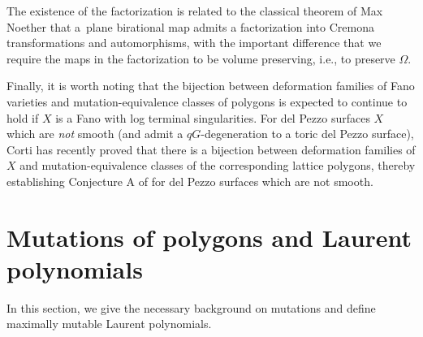 \documentclass[pdftex]{sigma}
\numberwithin{equation}{section}
\begin{document}
The existence of the factorization is related to the classical theorem of Max Noether that a~plane birational map admits a factorization into Cremona transformations and automorphisms, with the important difference that we require the maps in the factorization to be volume preserving, i.e., to preserve $\Omega$.

Finally, it is worth noting that the bijection between deformation families of Fano varieties and mutation-equivalence classes of polygons is expected to continue to hold if $X$ is a Fano with log terminal singularities. For del Pezzo surfaces $X$ which are \emph{not} smooth (and admit a $qG$-degeneration to a toric del Pezzo surface), Corti \cite{Corti} has recently proved that there is a bijection between deformation families of $X$ and mutation-equivalence classes of the corresponding lattice polygons, thereby establishing Conjecture A of \cite{AkhtarCoatesCorti} for del Pezzo surfaces which are not smooth.

\section{Mutations of polygons and Laurent polynomials}\label{sec:combinatorics}
In this section, we give the necessary background on mutations and define maximally mutable Laurent polynomials.
\end{document}
